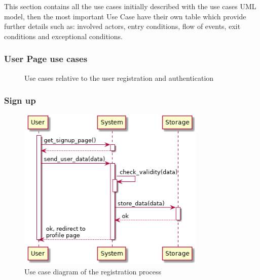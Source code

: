 This section contains all the use cases initially described with the use cases UML model, then the most important Use Case have their own table which provide further details such as: involved actors, entry conditions, flow of events,  exit conditions and exceptional conditions.

\subsubsection{User Page use cases}
\begin{figure}[htp] 
\caption{Use cases relative to the user registration and authentication} 
\label{fig:userpage} 
\end{figure} 

\newpage
\subsubsection{Sign up}

\newpage
\begin{figure}[htp]
	\centering
	\includegraphics[width=0.8\textwidth]{images/useCases/sign_up.png}
	\caption{Use case diagram of the registration process}
	\label{fig:userpage}
\end{figure}
\newpage
